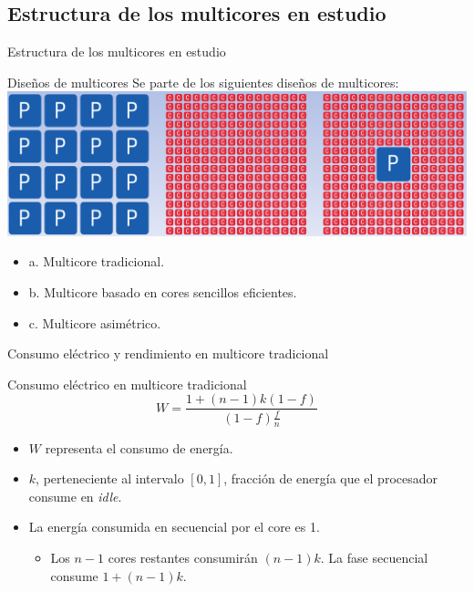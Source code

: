\documentclass[utf8]{beamer}
\begin{document}
\subsection*{Estructura de los multicores en estudio}
\begin{frame}{Estructura de los multicores en estudio}
    \begin{block}{Diseños de multicores}
        Se parte de los siguientes diseños de multicores:
        \\
        \center\includegraphics[width=.8\linewidth]{figures/amd_power_structures}  
        \begin{itemize}
            \item a. Multicore tradicional. 
            \item b. Multicore basado en cores sencillos eficientes.
            \item c. Multicore asimétrico.
        \end{itemize}
    \end{block}    
\end{frame}

\begin{frame}{Consumo eléctrico y rendimiento en multicore tradicional}
    \begin{block}{Consumo eléctrico en multicore tradicional}
        $$ W = \frac{1 + (n - 1)k(1-f)}{(1 - f)\frac{f}{n}} $$
        \begin{itemize}
             \item $ W $ representa el consumo de energía.
             \item $ k $, perteneciente al intervalo $ [0,1] $, fracción de energía que el procesador consume en \textit{idle}.
             \item La energía consumida en secuencial por el core es 1.
                \begin{itemize}
                    \item Los $ n -1 $ cores restantes consumirán $ (n -1)k $. La fase secuencial consume $ 1 +  (n -1)k $.
                \end{itemize}
        \end{itemize}
    \end{block}  
\end{frame}
\end{document}

